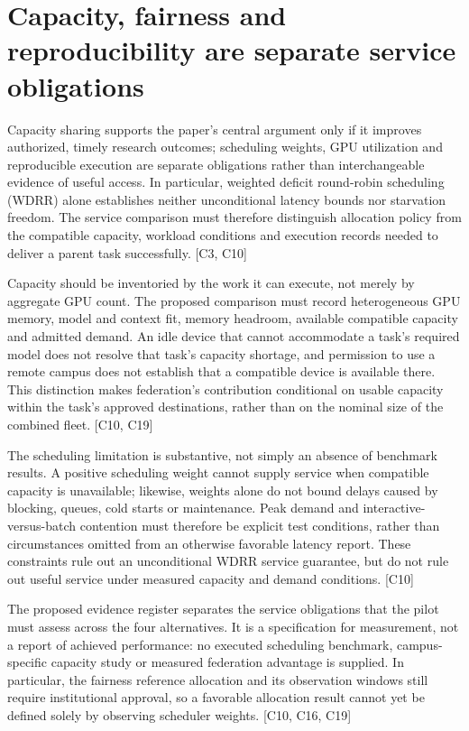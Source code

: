 \documentclass[11pt]{article}
\begin{document}
\section{Capacity, fairness and reproducibility are separate service obligations}
Capacity sharing supports the paper\textquoteright{}s central argument only if it improves authorized, timely research outcomes; scheduling weights, GPU utilization and reproducible execution are separate obligations rather than interchangeable evidence of useful access. In particular, weighted deficit round-robin scheduling (WDRR) alone establishes neither unconditional latency bounds nor starvation freedom. The service comparison must therefore distinguish allocation policy from the compatible capacity, workload conditions and execution records needed to deliver a parent task successfully. [C3, C10]

Capacity should be inventoried by the work it can execute, not merely by aggregate GPU count. The proposed comparison must record heterogeneous GPU memory, model and context fit, memory headroom, available compatible capacity and admitted demand. An idle device that cannot accommodate a task\textquoteright{}s required model does not resolve that task\textquoteright{}s capacity shortage, and permission to use a remote campus does not establish that a compatible device is available there. This distinction makes federation\textquoteright{}s contribution conditional on usable capacity within the task\textquoteright{}s approved destinations, rather than on the nominal size of the combined fleet. [C10, C19]

The scheduling limitation is substantive, not simply an absence of benchmark results. A positive scheduling weight cannot supply service when compatible capacity is unavailable; likewise, weights alone do not bound delays caused by blocking, queues, cold starts or maintenance. Peak demand and interactive-versus-batch contention must therefore be explicit test conditions, rather than circumstances omitted from an otherwise favorable latency report. These constraints rule out an unconditional WDRR service guarantee, but do not rule out useful service under measured capacity and demand conditions. [C10]

The proposed evidence register separates the service obligations that the pilot must assess across the four alternatives. It is a specification for measurement, not a report of achieved performance: no executed scheduling benchmark, campus-specific capacity study or measured federation advantage is supplied. In particular, the fairness reference allocation and its observation windows still require institutional approval, so a favorable allocation result cannot yet be defined solely by observing scheduler weights. [C10, C16, C19]
\end{document}
